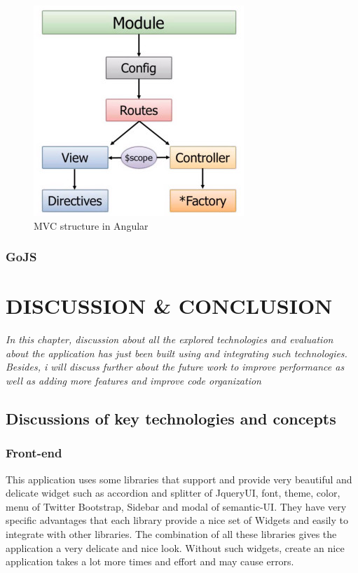 \documentclass[14pt,a4paper]{extreport}
\begin{document}
		\begin{figure}
			\begin{center}
				\includegraphics[scale=0.5]{angularmvc.png}
				\caption{MVC structure in Angular}
				\label{MVC}
			\end{center}
		\end{figure}
		

		\subsection{GoJS}
		
\chapter{DISCUSSION \& CONCLUSION}
	\textsl{In this chapter, discussion about all the explored technologies and evaluation about the application has just been built using and integrating such technologies. Besides, i will discuss further about the future work to improve performance as well as adding more features and improve code organization}
	\newpage 
	
	\section{Discussions of key technologies and concepts}
		\subsection{Front-end}
			This application uses some libraries that support and provide very beautiful and delicate widget such as accordion and splitter of JqueryUI, font, theme, color, menu of Twitter Bootstrap, Sidebar and modal of semantic-UI. They have very specific advantages that each library provide a nice set of Widgets and easily to integrate with other libraries. The combination of all these libraries gives the application a very delicate and nice look. Without such widgets, create an nice application takes a lot more times and effort and may cause errors.
		
\end{document}
